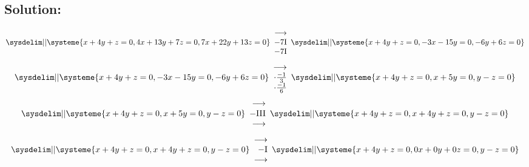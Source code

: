 \documentclass{article}
\begin{document}
\subsection*{Solution:}
\begin{equation*}
    \sysdelim||\systeme{
        x + 4y + z = 0,
        4x + 13y + 7z = 0,
        7x + 22y + 13z = 0
    }
    \begin{array}{rr}
        \longrightarrow \\
        -7$I$ \\
        -7$I$ \\
    \end{array}
    \sysdelim||\systeme{
        x + 4y + z = 0,
        -3x - 15y = 0,
        -6y + 6z = 0
    }
\end{equation*}
\begin{equation*}
    \sysdelim||\systeme{
        x + 4y + z = 0,
        -3x - 15y = 0,
        -6y + 6z = 0
    }
    \begin{array}{rr}
        \longrightarrow \\
        \cdot \frac{-1}{3} \\
        \cdot \frac{-1}{6} \\
    \end{array}
    \sysdelim||\systeme{
        x + 4y + z = 0,
        x + 5y = 0,
        y - z = 0
    }
\end{equation*}
\begin{equation*}
    \sysdelim||\systeme{
        x + 4y + z = 0,
        x + 5y = 0,
        y - z = 0
    }
    \begin{array}{rr}
        \longrightarrow \\
        -$III$\\
        \longrightarrow \\
    \end{array}
    \sysdelim||\systeme{
        x + 4y + z = 0,
        x + 4y + z = 0,
        y - z = 0
    }
\end{equation*}
\begin{equation*}
    \sysdelim||\systeme{
        x + 4y + z = 0,
        x + 4y + z = 0,
        y - z = 0
    }
    \begin{array}{rr}
        \longrightarrow \\
        -$I$\\
        \longrightarrow \\
    \end{array}
    \sysdelim||\systeme{
        x + 4y + z = 0,
        0x + 0y + 0z = 0,
        y - z = 0
    }
\end{equation*}
\end{document}
